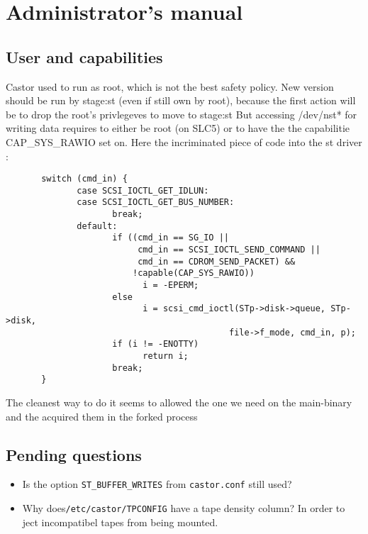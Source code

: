 
\chapter{Administrator's manual}
\section{User and capabilities}
Castor used to run as root, which is not the best safety policy. New version should be run by stage:st (even if still own by root),
because the first action will be to drop the root's privlegeves to move to stage:st
But accessing /dev/nst* for writing data requires to either be root (on SLC5) or to have the the capabilitie CAP\_SYS\_RAWIO set on. 
Here the incriminated piece of code into the st driver :
\begin{table}[h]
\begin{lstlisting}
       switch (cmd_in) {
              case SCSI_IOCTL_GET_IDLUN:
              case SCSI_IOCTL_GET_BUS_NUMBER:
                     break;
              default:
                     if ((cmd_in == SG_IO ||
                          cmd_in == SCSI_IOCTL_SEND_COMMAND ||
                          cmd_in == CDROM_SEND_PACKET) &&
                         !capable(CAP_SYS_RAWIO))
                           i = -EPERM;
                     else
                           i = scsi_cmd_ioctl(STp->disk->queue, STp->disk,
                                            file->f_mode, cmd_in, p);
                     if (i != -ENOTTY)
                           return i;
                     break;
       }
\end{lstlisting}
\end{table}

The cleanest way to do it seems to allowed the one we need on the main-binary and the acquired them in the forked process
\section{Pending questions}
\begin{itemize}
\item{}Is the option \verb#ST_BUFFER_WRITES# from \verb#castor.conf# still used?
\item{}Why does\verb#/etc/castor/TPCONFIG# have a tape density column? In order to ject incompatibel tapes from being mounted.
\end{itemize}

